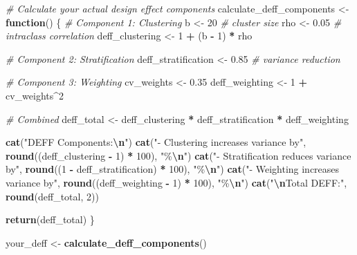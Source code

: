 \documentclass[
]{article}
\newenvironment{Shaded}{\begin{snugshade}}{\end{snugshade}}
\newcommand{\CommentTok}[1]{\textcolor[rgb]{0.56,0.35,0.01}{\textit{#1}}}
\newcommand{\ControlFlowTok}[1]{\textcolor[rgb]{0.13,0.29,0.53}{\textbf{#1}}}
\newcommand{\DecValTok}[1]{\textcolor[rgb]{0.00,0.00,0.81}{#1}}
\newcommand{\FloatTok}[1]{\textcolor[rgb]{0.00,0.00,0.81}{#1}}
\newcommand{\FunctionTok}[1]{\textcolor[rgb]{0.13,0.29,0.53}{\textbf{#1}}}
\newcommand{\NormalTok}[1]{#1}
\newcommand{\OtherTok}[1]{\textcolor[rgb]{0.56,0.35,0.01}{#1}}
\newcommand{\SpecialCharTok}[1]{\textcolor[rgb]{0.81,0.36,0.00}{\textbf{#1}}}
\newcommand{\StringTok}[1]{\textcolor[rgb]{0.31,0.60,0.02}{#1}}
\begin{document}
\begin{Shaded}
\begin{Highlighting}[]
\CommentTok{\# Calculate your actual design effect components}
\NormalTok{calculate\_deff\_components }\OtherTok{\textless{}{-}} \ControlFlowTok{function}\NormalTok{() \{}
  \CommentTok{\# Component 1: Clustering}
\NormalTok{  b }\OtherTok{\textless{}{-}} \DecValTok{20}  \CommentTok{\# cluster size}
\NormalTok{  rho }\OtherTok{\textless{}{-}} \FloatTok{0.05}  \CommentTok{\# intraclass correlation}
\NormalTok{  deff\_clustering }\OtherTok{\textless{}{-}} \DecValTok{1} \SpecialCharTok{+}\NormalTok{ (b }\SpecialCharTok{{-}} \DecValTok{1}\NormalTok{) }\SpecialCharTok{*}\NormalTok{ rho}
  
  \CommentTok{\# Component 2: Stratification}
\NormalTok{  deff\_stratification }\OtherTok{\textless{}{-}} \FloatTok{0.85}  \CommentTok{\# variance reduction}
  
  \CommentTok{\# Component 3: Weighting}
\NormalTok{  cv\_weights }\OtherTok{\textless{}{-}} \FloatTok{0.35}
\NormalTok{  deff\_weighting }\OtherTok{\textless{}{-}} \DecValTok{1} \SpecialCharTok{+}\NormalTok{ cv\_weights}\SpecialCharTok{\^{}}\DecValTok{2}
  
  \CommentTok{\# Combined}
\NormalTok{  deff\_total }\OtherTok{\textless{}{-}}\NormalTok{ deff\_clustering }\SpecialCharTok{*}\NormalTok{ deff\_stratification }\SpecialCharTok{*}\NormalTok{ deff\_weighting}
  
  \FunctionTok{cat}\NormalTok{(}\StringTok{"DEFF Components:}\SpecialCharTok{\textbackslash{}n}\StringTok{"}\NormalTok{)}
  \FunctionTok{cat}\NormalTok{(}\StringTok{"{-} Clustering increases variance by"}\NormalTok{, }
      \FunctionTok{round}\NormalTok{((deff\_clustering }\SpecialCharTok{{-}} \DecValTok{1}\NormalTok{) }\SpecialCharTok{*} \DecValTok{100}\NormalTok{), }\StringTok{"\%}\SpecialCharTok{\textbackslash{}n}\StringTok{"}\NormalTok{)}
  \FunctionTok{cat}\NormalTok{(}\StringTok{"{-} Stratification reduces variance by"}\NormalTok{,}
      \FunctionTok{round}\NormalTok{((}\DecValTok{1} \SpecialCharTok{{-}}\NormalTok{ deff\_stratification) }\SpecialCharTok{*} \DecValTok{100}\NormalTok{), }\StringTok{"\%}\SpecialCharTok{\textbackslash{}n}\StringTok{"}\NormalTok{)}
  \FunctionTok{cat}\NormalTok{(}\StringTok{"{-} Weighting increases variance by"}\NormalTok{,}
      \FunctionTok{round}\NormalTok{((deff\_weighting }\SpecialCharTok{{-}} \DecValTok{1}\NormalTok{) }\SpecialCharTok{*} \DecValTok{100}\NormalTok{), }\StringTok{"\%}\SpecialCharTok{\textbackslash{}n}\StringTok{"}\NormalTok{)}
  \FunctionTok{cat}\NormalTok{(}\StringTok{"}\SpecialCharTok{\textbackslash{}n}\StringTok{Total DEFF:"}\NormalTok{, }\FunctionTok{round}\NormalTok{(deff\_total, }\DecValTok{2}\NormalTok{))}
  
  \FunctionTok{return}\NormalTok{(deff\_total)}
\NormalTok{\}}

\NormalTok{your\_deff }\OtherTok{\textless{}{-}} \FunctionTok{calculate\_deff\_components}\NormalTok{()}
\end{Highlighting}
\end{Shaded}
\end{document}
